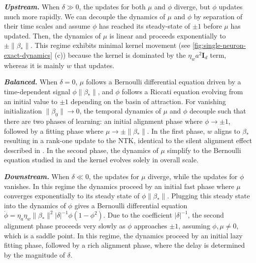 \documentclass{article}
\theoremstyle{plain}
\theoremstyle{definition}
\theoremstyle{remark}
\begin{document}
\emph{\textbf{Upstream.}}
%
When $\delta \gg 0$, the updates for both $\mu$ and $\phi$ diverge, but $\phi$ updates much more rapidly.
%
We can decouple the dynamics of $\mu$ and $\phi$ by separation of their time scales and assume $\phi$ has reached its steady-state of $\pm 1$ before $\mu$ has updated.
%
Then, the dynamics of $\mu$ is linear and proceeds exponentially to $\pm \|\beta_*\|$.
%
This regime exhibits minimal kernel movement (see \cref{fig:single-neuron-exact-dynamics} (c)) because the kernel is dominated by the $\eta_wa^2\mathbf{I}_d$ term, whereas it is mainly $w$ that updates.

\emph{\textbf{Balanced.}}
%
When $\delta = 0$, $\mu$ follows a Bernoulli differential equation driven by a time-dependent signal $\phi \|\beta_*\|$, and $\phi$ follows a Riccati equation evolving from an initial value to $\pm 1$ depending on the basin of attraction.
%
For vanishing initialization $\|\beta_0\| \to 0$, the temporal dynamics of $\mu$ and $\phi$ decouple such that there are two phases of learning: 
an initial alignment phase where $\phi \to \pm 1$, followed by a fitting phase where $\mu \to \pm\|\beta_*\|$.
%
In the first phase, $w$ aligns to $\beta_*$ resulting in a rank-one update to the NTK, identical to the silent alignment effect described in \citet{atanasov2021neural}.
%
In the second phase, the dynamics of $\mu$ simplify to the Bernoulli equation studied in \citet{saxe2013exact} and the kernel evolves solely in overall scale.

\emph{\textbf{Downstream.}}
%
When $\delta \ll 0$, the updates for $\mu$ diverge, while the updates for $\phi$ vanishes.
%
In this regime the dynamics proceed by an initial fast phase where $\mu$ converges exponentially to its steady state of $\phi\|\beta_*\|$.
%
Plugging this steady state into the dynamics of $\phi$ gives a Bernoulli differential equation $\dot{\phi} = \eta_a\eta_w\|\beta_*\|^2|\delta|^{-1}\phi(1 - \phi^2)$.
%
Due to the coefficient $|\delta|^{-1}$, the second alignment phase proceeds very slowly as $\phi$ approaches $\pm 1$, assuming $\phi, \mu \neq 0$, which is a saddle point.
%
In this regime, the dynamics proceed by an initial lazy fitting phase, followed by a rich alignment phase, where the delay is determined by the magnitude of $\delta$.



\end{document}
